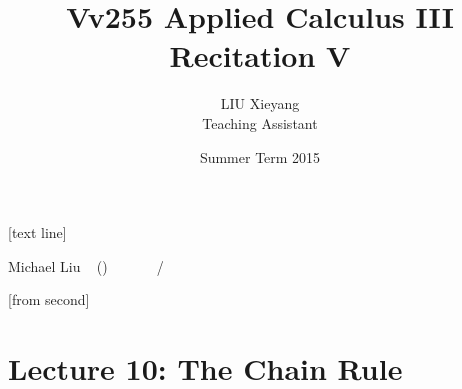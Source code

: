 \documentclass[10pt]{beamer}
\begin{document}



[text line]{%
	\color{blue!40!black}\parbox{\linewidth}{\vspace*{-8pt}Michael Liu ~ (\insertshortinstitute)\hfill\insertshorttitle\hfill\insertshortdate~~~~~~\insertframenumber{}~/~\inserttotalframenumber}}


[from second] 

\newcommand{\tabincell}[2]{\begin{tabular}{@{}#1@{}}#2\end{tabular}}


\title[Vv255 Applied Calculus III]{Vv255 Applied Calculus III\\{\small Recitation V}}   
\author[Michael Liu]{LIU Xieyang\\{\tiny Teaching Assistant}} 
\date[Summer 2015]{Summer Term 2015} 
\begin{frame}
	\titlepage
\end{frame}






\section{Lecture 10: The Chain Rule} 
\end{document}
